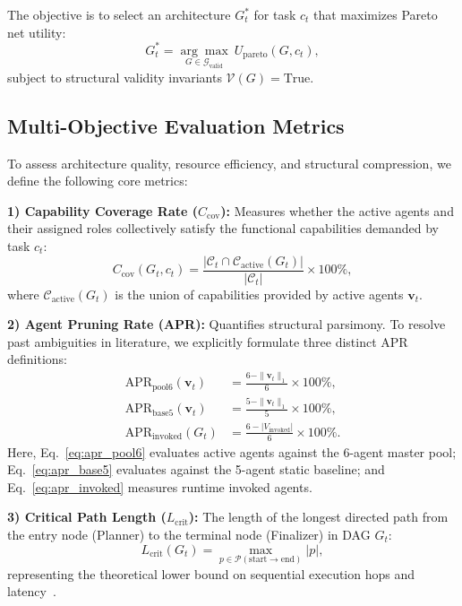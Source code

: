 \documentclass[conference]{IEEEtran}
\begin{document}
The objective is to select an architecture $G_t^*$ for task $c_t$ that maximizes Pareto net utility:
\begin{equation}
G_t^* = \underset{G \in \mathcal{G}_{\mathrm{valid}}}{\arg\max} \ U_{\mathrm{pareto}}(G, c_t),
\end{equation}
subject to structural validity invariants $\mathcal{V}(G) = \text{True}$.

\subsection{Multi-Objective Evaluation Metrics}
To assess architecture quality, resource efficiency, and structural compression, we define the following core metrics:

\textbf{1) Capability Coverage Rate ($C_{\mathrm{cov}}$):}
Measures whether the active agents and their assigned roles collectively satisfy the functional capabilities demanded by task $c_t$:
\begin{equation}
C_{\mathrm{cov}}(G_t, c_t) = \frac{|\mathcal{C}_t \cap \mathcal{C}_{\mathrm{active}}(G_t)|}{|\mathcal{C}_t|} \times 100\%,
\end{equation}
where $\mathcal{C}_{\mathrm{active}}(G_t)$ is the union of capabilities provided by active agents $\mathbf{v}_t$.

\textbf{2) Agent Pruning Rate (APR):}
Quantifies structural parsimony. To resolve past ambiguities in literature, we explicitly formulate three distinct APR definitions:
\begin{align}
\mathrm{APR}_{\mathrm{pool6}}(\mathbf{v}_t) &= \frac{6 - \|\mathbf{v}_t\|_1}{6} \times 100\%, \label{eq:apr_pool6} \\
\mathrm{APR}_{\mathrm{base5}}(\mathbf{v}_t) &= \frac{5 - \|\mathbf{v}_t\|_1}{5} \times 100\%, \label{eq:apr_base5} \\
\mathrm{APR}_{\mathrm{invoked}}(G_t) &= \frac{6 - |V_{\mathrm{invoked}}|}{6} \times 100\%. \label{eq:apr_invoked}
\end{align}
Here, Eq.~\eqref{eq:apr_pool6} evaluates active agents against the 6-agent master pool; Eq.~\eqref{eq:apr_base5} evaluates against the 5-agent static baseline; and Eq.~\eqref{eq:apr_invoked} measures runtime invoked agents.

\textbf{3) Critical Path Length ($L_{\mathrm{crit}}$):}
The length of the longest directed path from the entry node (Planner) to the terminal node (Finalizer) in DAG $G_t$:
\begin{equation}
L_{\mathrm{crit}}(G_t) = \max_{p \in \mathcal{P}(\text{start} \to \text{end})} |p|,
\end{equation}
representing the theoretical lower bound on sequential execution hops and latency~\cite{Li2025AdaptiveGraphPruning}.
\end{document}
